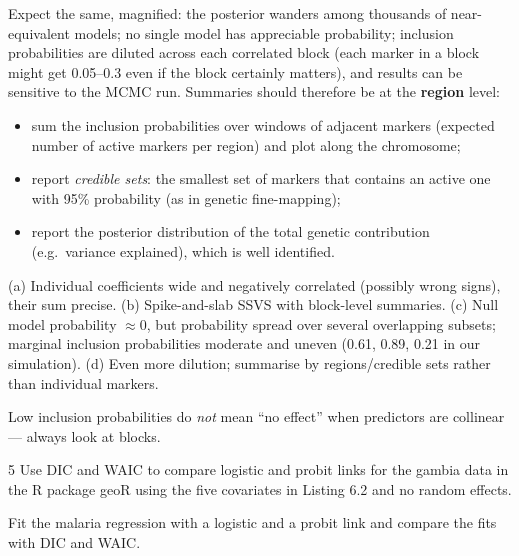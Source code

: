 \documentclass[11pt]{article}
\begin{document}
 Expect the same, magnified: the posterior wanders among thousands of near-equivalent models; no single model has appreciable probability; inclusion probabilities are diluted across each correlated block (each marker in a block might get 0.05--0.3 even if the block certainly matters), and results can be sensitive to the MCMC run. Summaries should therefore be at the \textbf{region} level:
\begin{itemize}
\item sum the inclusion probabilities over windows of adjacent markers (expected number of active markers per region) and plot along the chromosome;
\item report \emph{credible sets}: the smallest set of markers that contains an active one with 95\% probability (as in genetic fine-mapping);
\item report the posterior distribution of the total genetic contribution (e.g.\ variance explained), which is well identified.
\end{itemize}

\begin{answer}
(a) Individual coefficients wide and negatively correlated (possibly wrong signs), their sum precise. (b) Spike-and-slab SSVS with block-level summaries. (c) Null model probability $\approx0$, but probability spread over several overlapping subsets; marginal inclusion probabilities moderate and uneven (0.61, 0.89, 0.21 in our simulation). (d) Even more dilution; summarise by regions/credible sets rather than individual markers.
\end{answer}

\begin{takeaway}
Low inclusion probabilities do \emph{not} mean ``no effect'' when predictors are collinear --- always look at blocks.
\end{takeaway}


\begin{problem}{5}
Use DIC and WAIC to compare logistic and probit links for the gambia data in the R package geoR using the five covariates in Listing 6.2 and no random effects.
\end{problem}

\begin{restate}
Fit the malaria regression with a logistic and a probit link and compare the fits with DIC and WAIC.
\end{restate}
\end{document}
